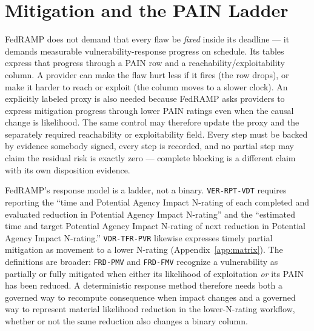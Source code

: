 \documentclass[11pt]{article}
\newcommand{\code}[1]{\texttt{#1}}
\begin{document}
\section{Mitigation and the PAIN Ladder}
\label{sec:ladder}
\begin{plain}
FedRAMP does not demand that every flaw be \emph{fixed} inside its deadline --- it
demands measurable vulnerability-response progress on schedule. Its tables express
that progress through a PAIN row and a reachability/exploitability column. A provider
can make the flaw hurt less if it fires (the row drops), or make it harder to reach
or exploit (the column moves to a slower clock). An explicitly labeled proxy is
also needed because FedRAMP asks providers to express mitigation progress through
lower PAIN ratings even when the causal change is likelihood. The same control may
therefore update the proxy and the separately required reachability or
exploitability field. Every step must be backed by evidence somebody signed, every
step is recorded, and no partial step may claim the residual risk is exactly zero
--- complete blocking is a different claim with its own disposition evidence.
\end{plain}

FedRAMP's response model is a ladder, not a binary. \code{VER-RPT-VDT} requires
reporting the ``time and Potential Agency Impact N-rating of each completed and
evaluated reduction in Potential Agency Impact N-rating'' and the ``estimated time
and target Potential Agency Impact N-rating of next reduction in Potential Agency
Impact N-rating.'' \code{VDR-TFR-PVR} likewise expresses timely partial mitigation
as movement to a lower N-rating (Appendix~\ref{app:matrix}). The definitions are
broader: \code{FRD-PMV} and \code{FRD-FMV} recognize a vulnerability as partially or
fully mitigated when either its likelihood of exploitation \emph{or} its PAIN has
been reduced. A deterministic response method therefore needs both a governed way
to recompute consequence when impact changes and a governed way to represent
material likelihood reduction in the lower-N-rating workflow, whether or not the
same reduction also changes a binary column.
\end{document}
